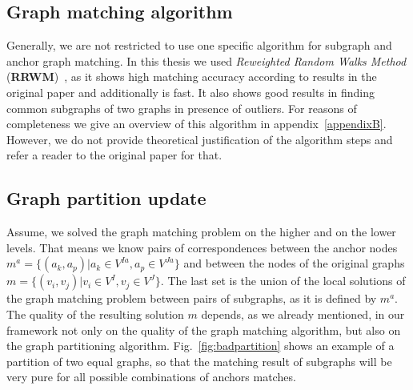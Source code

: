 \subsection{Graph matching algorithm}
Generally, we are not restricted to use one specific algorithm for subgraph and anchor graph matching. In this thesis we used \emph{Reweighted Random Walks Method} (\textbf{RRWM})~\cite{Cho2010_RRWM}, as it shows high matching accuracy according to results in the original paper and additionally is fast. It also shows good results in finding common subgraphs of two graphs in presence of outliers.
For reasons of completeness we give an overview of this algorithm in appendix~\ref{appendixB}. However, we do not provide theoretical justification of the algorithm steps and refer a reader to the original paper for that. 

\subsection{Graph partition update} \label{updateRule}
Assume, we solved the graph matching problem on the higher and on the lower levels. That means we know pairs of correspondences between the anchor nodes $m^a = \{(a_k, a_p)|a_k\in V^{Ia}, a_p\in V^{Ja}\}$ and between the nodes of the original graphs $m = \{(v_i, v_j)|v_i\in V^{I}, v_j\in V^{J}\}$. The last set is the union of the local solutions of the graph matching problem between pairs of subgraphs, as it is defined by $m^a$.
The quality of the resulting solution $m$ depends, as we already mentioned, in our framework not only on the quality of the graph matching algorithm, but also on the graph partitioning algorithm.	
Fig.~\ref{fig:badpartition} shows an example of a partition of two equal graphs, so that the matching result of subgraphs will be very pure for all possible combinations of anchors matches.

